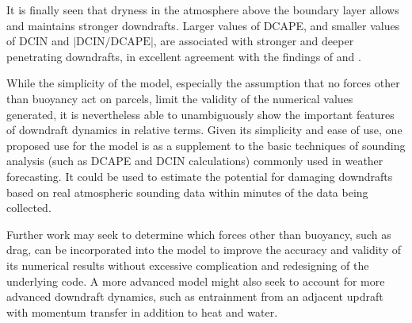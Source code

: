 \documentclass[12pt,titlepage]{article}
\newcommand{\dcape}{\mathrm{DCAPE}}
\newcommand{\dcin}{\mathrm{DCIN}}
\begin{document}
It is finally seen that dryness in the atmosphere above the boundary
layer allows and maintains stronger downdrafts. Larger values of
DCAPE, and smaller values of DCIN and $|\dcin/\dcape|$, are associated
with stronger and deeper penetrating downdrafts, in excellent agreement
with the findings of \textcite{market_2017} and \textcite{sumrall_2020}.

While the simplicity of the model, especially the assumption that
no forces other than buoyancy act on parcels, limit the validity of
the numerical values generated, it is nevertheless able to
unambiguously show the important features of downdraft dynamics in
relative terms. Given its simplicity and ease of use, one proposed use
for the model is as a supplement to the basic techniques of sounding
analysis (such as DCAPE and DCIN calculations) commonly used in
weather forecasting. It could be used to estimate the potential for
damaging downdrafts based on real atmospheric sounding data within minutes
of the data being collected.

Further work may seek to determine which forces other than buoyancy,
such as drag, can be incorporated into the model to improve the
accuracy and validity of its numerical results without excessive
complication and redesigning of the underlying code. A more advanced
model might also seek to account for more advanced downdraft dynamics,
such as entrainment from an adjacent updraft with momentum transfer
in addition to heat and water.


\clearpage
\printbibliography
\end{document}
